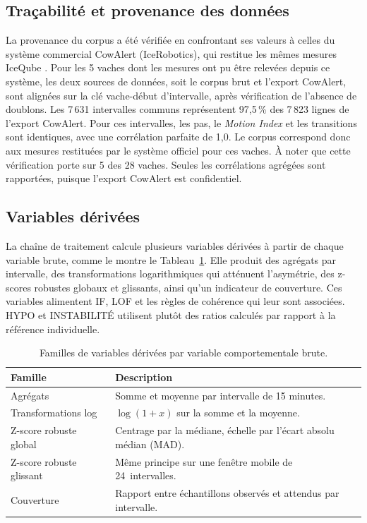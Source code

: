 \subsection{Traçabilité et provenance des données}
La provenance du corpus a été vérifiée en confrontant ses valeurs à celles du système
commercial CowAlert (IceRobotics), qui restitue les mêmes mesures IceQube
\citep{icerobotics2012cowalert}. Pour les 5 vaches dont les mesures ont pu être relevées
depuis ce système, les deux sources de données, soit le corpus brut et l'export CowAlert,
sont alignées sur la clé vache-début d'intervalle, après vérification de l'absence de
doublons. Les 7\,631 intervalles communs représentent 97,5\,\% des 7\,823 lignes de
l'export CowAlert. Pour ces intervalles, les pas, le \textit{Motion Index} et les
transitions sont identiques, avec une corrélation parfaite de 1,0. Le corpus correspond
donc aux mesures restituées par le système officiel pour ces vaches. À noter que cette
vérification porte sur 5 des 28 vaches. Seules les corrélations agrégées sont rapportées,
puisque l'export CowAlert est confidentiel.

\subsection{Variables dérivées}
La chaîne de traitement calcule plusieurs variables dérivées à partir de chaque variable
brute, comme le montre le Tableau~\ref{tab:features}. Elle produit des agrégats par intervalle,
des transformations logarithmiques qui atténuent l'asymétrie, des z-scores robustes globaux
et glissants, ainsi qu'un indicateur de couverture. Ces variables alimentent IF, LOF et les
règles de cohérence qui leur sont associées. HYPO et INSTABILITÉ utilisent plutôt des ratios
calculés par rapport à la référence individuelle.

\begin{table}[H]
  \centering
  \caption{Familles de variables dérivées par variable comportementale brute.}
  \label{tab:features}
  \small
  \begin{tabular}{p{}p{}}
    \toprule
    Famille & Description \\
    \midrule
    Agrégats & Somme et moyenne par intervalle de 15 minutes. \\
    Transformations log & $\log(1+x)$ sur la somme et la moyenne. \\
    Z-score robuste global & Centrage par la médiane, échelle par l'écart absolu médian (MAD). \\
    Z-score robuste glissant & Même principe sur une fenêtre mobile de 24~intervalles. \\
    Couverture & Rapport entre échantillons observés et attendus par intervalle. \\
    \bottomrule
  \end{tabular}
\end{table}

